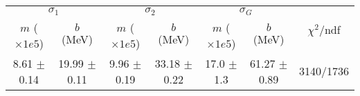 \begin{tabular}{cc|cc|cc||c}
\multicolumn{2}{c|}{$\sigma_1$} & \multicolumn{2}{|c}{$\sigma_2$} & \multicolumn{2}{|c}{$\sigma_G$}  & \multirow{2}{*}{$\chi^2/$ndf}\\
$m$ ($\times1e5$) & $b$ (MeV) & $m$ ($\times1e5$) & $b$ (MeV) & $m$ ($\times1e5$) & $b$ (MeV) & \\
\hline
8.61 $\pm$ 0.14 & 19.99 $\pm$ 0.11 & 9.96 $\pm$ 0.19 & 33.18 $\pm$ 0.22 & 17.0 $\pm$ 1.3 & 61.27 $\pm$ 0.89 & 3140/1736\\
\end{tabular}
